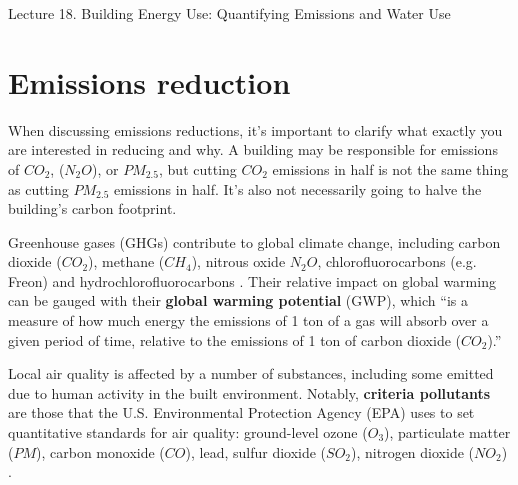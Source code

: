 \documentclass[10pt]{article}
\begin{document}
   \noindent
   \begin{center}

   \hrulefill
   
   \vspace{5pt}
   
   \vspace{0pt}
   
   {\Large \hfill  Lecture 18. Building Energy Use: Quantifying Emissions and Water Use}
   \vspace{5pt}
   
 {}
  
   \hrulefill
   \end{center}



\section{Emissions reduction}

When discussing emissions reductions, it's important to clarify what exactly you are interested in reducing and why. A building may be responsible for emissions of $CO_2$, ($N_2O$), or $PM_{2.5}$, but cutting $CO_2$ emissions in half is not the same thing as cutting $PM_{2.5}$ emissions in half. It's also not necessarily going to halve the building's carbon footprint.

Greenhouse gases (GHGs) contribute to global climate change, including carbon dioxide ($CO_2$), methane ($CH_4$), nitrous oxide $N_2O$, chlorofluorocarbons (e.g. Freon) and hydrochlorofluorocarbons \cite{Epa2014-mz}. Their relative impact on global warming can be gauged with their \textbf{global warming potential} (GWP), which ``is a measure of how much energy the emissions of 1 ton of a gas will absorb over a given period of time, relative to the emissions of 1 ton of carbon dioxide ($CO_2$).'' \cite{Epa2017-ur}

Local air quality is affected by a number of substances, including some emitted due to human activity in the built environment. Notably, \textbf{criteria pollutants} are those that the U.S. Environmental Protection Agency (EPA) uses to set quantitative standards for air quality: ground-level ozone ($O_3$), particulate matter ($PM$), carbon monoxide ($CO$), lead, sulfur dioxide ($SO_2$), nitrogen dioxide ($NO_2$) \cite{Epa2014-xv}.
\end{document}

